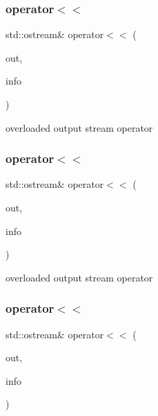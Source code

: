 \subsubsection{\texorpdfstring{operator$<$$<$}{operator<<}\hspace{0.1cm}{\footnotesize\ttfamily [1/3]}}
{\footnotesize\ttfamily std\+::ostream\& operator$<$$<$ (\begin{DoxyParamCaption}\item[{std\+::ostream \&}]{out,  }\item[{const \mbox{\hyperlink{classFILEDB_1_1ConfigInfo}{Config\+Info}} \&}]{info }\end{DoxyParamCaption})\hspace{0.3cm}{\ttfamily [friend]}}

overloaded output stream operator \mbox{\label{classFILEDB_1_1ConfigInfo_a2aa453414301c12055ae76f2bfdc8f87}} 
\subsubsection{\texorpdfstring{operator$<$$<$}{operator<<}\hspace{0.1cm}{\footnotesize\ttfamily [2/3]}}
{\footnotesize\ttfamily std\+::ostream\& operator$<$$<$ (\begin{DoxyParamCaption}\item[{std\+::ostream \&}]{out,  }\item[{const \mbox{\hyperlink{classFILEDB_1_1ConfigInfo}{Config\+Info}} \&}]{info }\end{DoxyParamCaption})\hspace{0.3cm}{\ttfamily [friend]}}

overloaded output stream operator \mbox{\label{classFILEDB_1_1ConfigInfo_a2aa453414301c12055ae76f2bfdc8f87}} 
\subsubsection{\texorpdfstring{operator$<$$<$}{operator<<}\hspace{0.1cm}{\footnotesize\ttfamily [3/3]}}
{\footnotesize\ttfamily std\+::ostream\& operator$<$$<$ (\begin{DoxyParamCaption}\item[{std\+::ostream \&}]{out,  }\item[{const \mbox{\hyperlink{classFILEDB_1_1ConfigInfo}{Config\+Info}} \&}]{info }\end{DoxyParamCaption})\hspace{0.3cm}{\ttfamily [friend]}}

